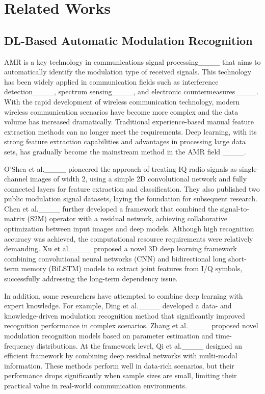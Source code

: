 \section{Related Works}
\label{sec:Related Works}
\subsection{DL-Based Automatic Modulation Recognition}
AMR is a key technology in communications signal processing____ that aims to automatically identify the modulation type of received signals. This technology has been widely applied in communication fields such as interference detection____, spectrum sensing____, and electronic countermeasures____. With the rapid development of wireless communication technology, modern wireless communication scenarios have become more complex and the data volume has increased dramatically. Traditional experience-based manual feature extraction methods can no longer meet the requirements. Deep learning, with its strong feature extraction capabilities and advantages in processing large data sets, has gradually become the mainstream method in the AMR field ____.

O'Shea et al.____ pioneered the approach of treating IQ radio signals as single-channel images of width 2, using a simple 2D convolutional network and fully connected layers for feature extraction and classification. They also published two public modulation signal datasets, laying the foundation for subsequent research. Chen et al.____ further developed a framework that combined the signal-to-matrix (S2M) operator with a residual network, achieving collaborative optimization between input images and deep models. Although high recognition accuracy was achieved, the computational resource requirements were relatively demanding. Xu et al.____ proposed a novel 3D deep learning framework combining convolutional neural networks (CNN) and bidirectional long short-term memory (BiLSTM) models to extract joint features from I/Q symbols, successfully addressing the long-term dependency issue.

In addition, some researchers have attempted to combine deep learning with expert knowledge. For example, Ding et al.____ developed a data- and knowledge-driven modulation recognition method that significantly improved recognition performance in complex scenarios. Zhang et al.____ proposed novel modulation recognition models based on parameter estimation and time-frequency distributions. At the framework level, Qi et al.____ designed an efficient framework by combining deep residual networks with multi-modal information. These methods perform well in data-rich scenarios, but their performance drops significantly when sample sizes are small, limiting their practical value in real-world communication environments.

